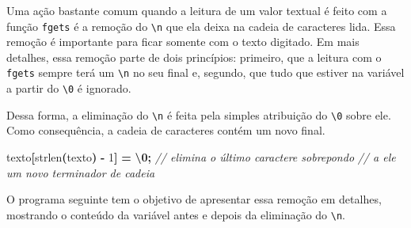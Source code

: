 \documentclass[
  11pt,
  a4paper,
]{scrbook}
\newenvironment{Shaded}{\begin{snugshade}}{\end{snugshade}}
\newcommand{\CharTok}[1]{\textcolor[rgb]{0.31,0.60,0.02}{#1}}
\newcommand{\CommentTok}[1]{\textcolor[rgb]{0.56,0.35,0.01}{\textit{#1}}}
\newcommand{\DecValTok}[1]{\textcolor[rgb]{0.00,0.00,0.81}{#1}}
\newcommand{\NormalTok}[1]{#1}
\newcommand{\OperatorTok}[1]{\textcolor[rgb]{0.81,0.36,0.00}{\textbf{#1}}}
\newcommand{\SpecialCharTok}[1]{\textcolor[rgb]{0.81,0.36,0.00}{\textbf{#1}}}
\begin{document}
Uma ação bastante comum quando a leitura de um valor textual é feito com
a função \texttt{fgets} é a remoção do \texttt{\textbackslash{}n} que
ela deixa na cadeia de caracteres lida. Essa remoção é importante para
ficar somente com o texto digitado. Em mais detalhes, essa remoção parte
de dois princípios: primeiro, que a leitura com o \texttt{fgets} sempre
terá um \texttt{\textbackslash{}n} no seu final e, segundo, que tudo que
estiver na variável a partir do \texttt{\textbackslash{}0} é ignorado.

Dessa forma, a eliminação do \texttt{\textbackslash{}n} é feita pela
simples atribuição do \texttt{\textbackslash{}0} sobre ele. Como
consequência, a cadeia de caracteres contém um novo final.

\begin{Shaded}
\begin{Highlighting}[]
\NormalTok{texto}\OperatorTok{[}\NormalTok{strlen}\OperatorTok{(}\NormalTok{texto}\OperatorTok{)} \OperatorTok{{-}} \DecValTok{1}\OperatorTok{]} \OperatorTok{=} \CharTok{\textquotesingle{}}\SpecialCharTok{\textbackslash{}0}\CharTok{\textquotesingle{}}\OperatorTok{;}  \CommentTok{// elimina o último caractere sobrepondo}
                                  \CommentTok{// a ele um novo terminador de cadeia}
\end{Highlighting}
\end{Shaded}

O programa seguinte tem o objetivo de apresentar essa remoção em
detalhes, mostrando o conteúdo da variável antes e depois da eliminação
do \texttt{\textbackslash{}n}.
\end{document}
